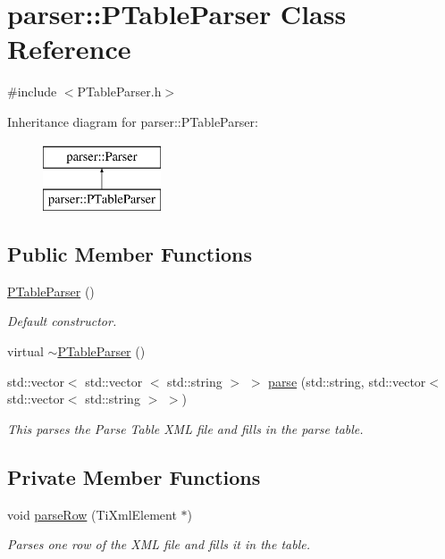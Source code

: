 \hypertarget{classparser_1_1PTableParser}{\section{parser\-:\-:\-P\-Table\-Parser \-Class \-Reference}
\label{da/d8c/classparser_1_1PTableParser}
}


{\ttfamily \#include $<$\-P\-Table\-Parser.\-h$>$}

\-Inheritance diagram for parser\-:\-:\-P\-Table\-Parser\-:\begin{figure}[H]
\begin{center}
\leavevmode
\includegraphics[height=2.000000cm]{da/d8c/classparser_1_1PTableParser}
\end{center}
\end{figure}
\subsection*{\-Public \-Member \-Functions}
\begin{DoxyCompactItemize}
\item 
\hyperlink{classparser_1_1PTableParser_a983ee5c9e9867bfcf82f38e701d3c546}{\-P\-Table\-Parser} ()
\begin{DoxyCompactList}\small\item\em \-Default constructor. \end{DoxyCompactList}\item 
virtual \hyperlink{classparser_1_1PTableParser_ae825bde72b66deb0ee4308ce3c7d100d}{$\sim$\-P\-Table\-Parser} ()
\item 
std\-::vector$<$ std\-::vector\*
$<$ std\-::string $>$ $>$ \hyperlink{classparser_1_1PTableParser_a6efa9956575713877360af5cb41b2e86}{parse} (std\-::string, std\-::vector$<$ std\-::vector$<$ std\-::string $>$ $>$)
\begin{DoxyCompactList}\small\item\em \-This parses the \-Parse \-Table \-X\-M\-L file and fills in the parse table. \end{DoxyCompactList}\end{DoxyCompactItemize}
\subsection*{\-Private \-Member \-Functions}
\begin{DoxyCompactItemize}
\item 
void \hyperlink{classparser_1_1PTableParser_ae20dc625548fbf58a387fa8dfee100ef}{parse\-Row} (\-Ti\-Xml\-Element $\ast$)
\begin{DoxyCompactList}\small\item\em \-Parses one row of the \-X\-M\-L file and fills it in the table. \end{DoxyCompactList}\end{DoxyCompactItemize}
